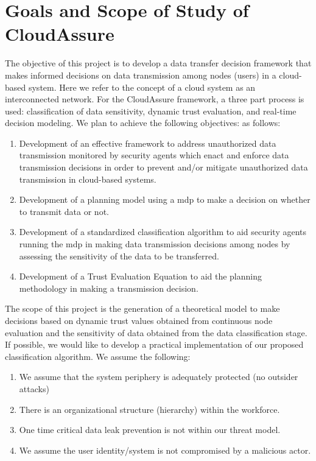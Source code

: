 \section{Goals and Scope of Study of CloudAssure}
The objective of this project is to develop a data transfer decision framework
that makes informed decisions on data transmission among nodes (users) in
a cloud-based system. Here we refer to the concept of a cloud system as an interconnected network.
For the CloudAssure framework, a three part process is used: classification of data sensitivity,
dynamic trust evaluation, and real-time decision modeling. We plan to achieve
the following objectives:
as follows: 
\begin{enumerate}
    \item Development of an effective framework to address unauthorized
        data transmission monitored by security agents which enact and enforce data
        transmission decisions in order to prevent and/or mitigate unauthorized data
        transmission in cloud-based systems.
    \item Development of a planning model using a \gls{mdp} to make a decision on whether to transmit data or not.
    \item Development of a standardized classification algorithm to aid security
        agents running the \gls{mdp} in making data transmission decisions among nodes
        by assessing the sensitivity of the data to be transferred.  
    \item Development of a Trust Evaluation Equation to aid the planning methodology in making a transmission decision.  
\end{enumerate}
The scope of this
project is the generation of a theoretical model to make decisions based
on dynamic trust values obtained from continuous node evaluation and the
sensitivity of data obtained from the data classification stage. If
possible, we would like to develop a practical implementation of our
proposed classification algorithm. We assume the following:

\begin{enumerate}
    \item We assume that the system periphery is adequately protected (no outsider attacks)
    \item There is an organizational structure (hierarchy) within the workforce.
    \item One time critical data leak prevention is not within our threat model.
    \item We assume the user identity/system is not compromised by a malicious actor.
\end{enumerate}

